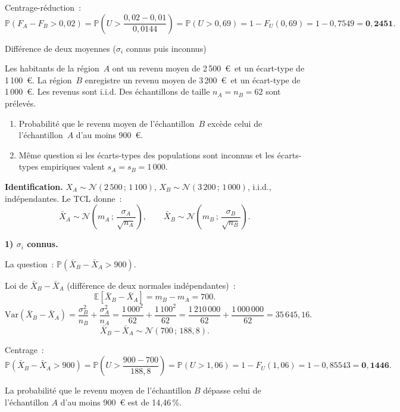 \documentclass[11pt,a4paper]{article}
\newcommand{\N}{\mathcal{N}}
\newcommand{\E}{\mathbb{E}}
\newcommand{\Var}{\mathrm{Var}}
\newcommand{\Prob}{\mathbb{P}}
\renewcommand{\P}{\Prob}
\newcommand{\corrsep}{\vspace{4pt}{\color{rulecol}\hrule height 0.6pt}\vspace{6pt}}
\begin{document}
Centrage-r\'eduction~:
$$\P(F_A-F_B>0{,}02) = \P\!\left(U>\frac{0{,}02-0{,}01}{0{,}0144}\right) = \P(U>0{,}69)
  = 1-F_U(0{,}69) = 1-0{,}7549 = \mathbf{0{,}2451}.$$

\begin{exercice}{Diff\'erence de deux moyennes ($\sigma_i$ connus puis inconnus)}

Les habitants de la r\'egion~$A$ ont un revenu moyen de 2\,500~\euro\ et un \'ecart-type de 1\,100~\euro.
La r\'egion~$B$ enregistre un revenu moyen de 3\,200~\euro\ et un \'ecart-type de 1\,000~\euro.
Les revenus sont i.i.d. Des \'echantillons de taille $n_A=n_B=62$ sont pr\'elev\'es.

\begin{enumerate}
  \item Probabilit\'e que le revenu moyen de l'\'echantillon~$B$ exc\`ede celui de l'\'echantillon~$A$ d'au moins 900~\euro.
  \item M\^eme question si les \'ecarts-types des populations sont inconnus et les \'ecarts-types empiriques valent $s_A=s_B=1\,000$.
\end{enumerate}
\end{exercice}

\corrsep

\textbf{Identification.} $X_A \sim \N(2\,500\,;\,1\,100)$, $X_B \sim \N(3\,200\,;\,1\,000)$, i.i.d., ind\'ependantes. Le TCL donne~:
$$\bar{X}_A \sim \N\!\left(m_A\,;\,\frac{\sigma_A}{\sqrt{n_A}}\right), \qquad
  \bar{X}_B \sim \N\!\left(m_B\,;\,\frac{\sigma_B}{\sqrt{n_B}}\right).$$

\textbf{1) $\sigma_i$ connus.}

La question~: $\P(\bar{X}_B - \bar{X}_A > 900)$.

Loi de $\bar{X}_B - \bar{X}_A$ (diff\'erence de deux normales ind\'ependantes)~:
$$\E[\bar{X}_B-\bar{X}_A] = m_B-m_A = 700.$$
$$\Var(\bar{X}_B-\bar{X}_A) = \frac{\sigma_B^2}{n_B}+\frac{\sigma_A^2}{n_A}
  = \frac{1\,000^2}{62}+\frac{1\,100^2}{62} = \frac{1\,210\,000}{62}+\frac{1\,000\,000}{62}
  = 35\,645{,}16.$$
$$\bar{X}_B-\bar{X}_A \sim \N(700\,;\,188{,}8).$$

Centrage~:
$$\P(\bar{X}_B-\bar{X}_A>900) = \P\!\left(U > \frac{900-700}{188{,}8}\right)
  = \P(U>1{,}06) = 1-F_U(1{,}06) = 1-0{,}85543 = \mathbf{0{,}1446}.$$

La probabilit\'e que le revenu moyen de l'\'echantillon $B$ d\'epasse celui de l'\'echantillon $A$ d'au moins 900~\euro{} est de 14,46\,\%.
\end{document}
